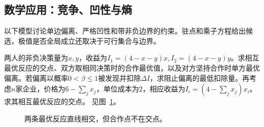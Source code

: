 \subsection{数学应用：竞争、凹性与熵}
以下模型讨论单边偏离、严格凹性和带非负边界的约束。驻点和乘子方程给出候选，极值是否全局成立还取决于可行集合与边界。
\begin{example}[竞争、合作与单边偏离]\label{ex:c3-e4}
两人的非负决策量为$x,y$，收益为$I_1=(4-x-y)x,I_2=(4-x-y)y$。求相互最优反应的交点、双方取相同决策时的合作最优值，以及对方坚持合作时单方最优偏离。若偏离以概率$0<\beta\le1$被发现并扣除$\Delta I$，求阻止偏离的最低扣除量。再考虑$n$家企业，价格为$6-\sum_jx_j$，单位成本为$2$，相应收益为$I_i=(4-\sum_jx_j)x_i$。求其相互最优反应的交点。 见图~\ref{fig:c3-e4-q}。
\end{example}

\begin{figure}[H]\centering
{}
\caption{两条最优反应直线相交，但合作点不在交点。}\label{fig:c3-e4-q}
\end{figure}
